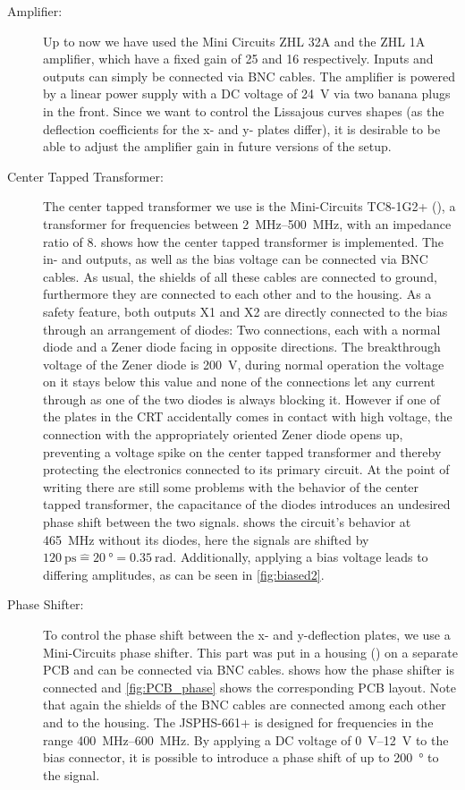 \begin{description}
	\item[Amplifier:] Up to now we have used the Mini Circuits ZHL 32A  and the ZHL 1A amplifier, which have a fixed gain of 25 and 16 respectively. Inputs and outputs can simply be connected via BNC cables. The amplifier is powered by a linear power supply with a DC voltage of \SI{24}{\volt} via two banana plugs in the front. Since we want to control the Lissajous curves shapes (as the deflection coefficients for the x- and y- plates differ), it is desirable to be able to adjust the amplifier gain in future versions of the setup. 
	
	\item[Center Tapped Transformer:] The center tapped transformer we use is the Mini-Circuits TC8-1G2+ (\cite{TC8-1G2}), a transformer for frequencies between \SIrange{2}{500}{\mega\hertz}, with an impedance ratio of 8.  shows how the center tapped transformer is implemented. The in- and outputs, as well as the bias voltage can be connected via BNC cables. As usual, the shields of all these cables are connected to ground, furthermore they are connected to each other and to the housing. As a safety feature, both outputs X1 and X2 are directly connected to the bias through an arrangement of diodes: Two connections, each with a normal diode and a Zener diode facing in opposite directions. The breakthrough voltage of the Zener diode is \SI{200}{\volt}, during normal operation the voltage on it stays below this value and none of the connections let any current through as one of the two diodes is always blocking it. However if one of the plates in the CRT accidentally comes in contact with high voltage, the connection with the appropriately oriented Zener diode opens up, preventing a voltage spike on the center tapped transformer and thereby protecting the electronics connected to its primary circuit.
	At the point of writing there are still some problems with the behavior of the center tapped transformer, the capacitance of the diodes introduces an undesired phase shift between the two signals.  shows the circuit's behavior at \SI{465}{\mega\hertz} without its diodes, here the signals are shifted by $\SI{120}{\pico\second} \mathrel{\widehat{=}} \SI{20}{\degree} = \SI{0.35}{\radian}$. Additionally, applying a bias voltage leads to differing amplitudes, as can be seen in \cref{fig:biased2}.
	
	\item[Phase Shifter:] To control the phase shift between the x- and y-deflection plates, we use a Mini-Circuits \cite{JSPHS-661} phase shifter. This part was put in a  housing (\cite{Hammond1455D601RD}) on a separate PCB and can be connected via BNC cables.  shows how the phase shifter is connected and \cref{fig:PCB_phase} shows the corresponding PCB layout. Note that again the shields of the BNC cables are connected among each other and to the housing. The JSPHS-661+ is designed for frequencies in the range \SIrange{400}{600}{\mega\hertz}. By applying a DC voltage of \SIrange{0}{12}{\volt} to the bias connector, it is possible to introduce a phase shift of up to \SI{200}{\degree} to the signal.
	

\end{description}
